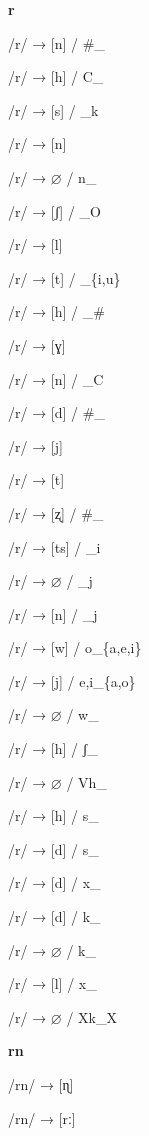 \begin{center}\textbf{r}\end{center}
\begin{multicols}{4}
\noindent /r/ → [n] / \#\_

\noindent /r/ → [h] / C\_

\noindent /r/ → [s] / \_k

\noindent /r/ → [n]

\noindent /r/ → $\varnothing$ / n\_

\noindent /r/ → [ʃ] / \_O

\noindent /r/ → [l]

\noindent /r/ → [t] / \_\{i,u\}

\noindent /r/ → [h] / \_\#

\noindent /r/ → [ɣ]

\noindent /r/ → [n] / \_C

\noindent /r/ → [d] / \#\_

\noindent /r/ → [j]

\noindent /r/ → [t]

\noindent /r/ → [ʐ] / \#\_

\noindent /r/ → [ts] / \_i

\noindent /r/ → $\varnothing$ / \_j

\noindent /r/ → [n] / \_j

\noindent /r/ → [w] / o\_\{a,e,i\}

\noindent /r/ → [j] / {e,i}\_\{a,o\}

\noindent /r/ → $\varnothing$ / w\_

\noindent /r/ → [h] / ʃ\_

\noindent /r/ → $\varnothing$ / Vh\_

\noindent /r/ → [h] / s\_

\noindent /r/ → [d] / s\_

\noindent /r/ → [d] / x\_

\noindent /r/ → [d] / k\_

\noindent /r/ → $\varnothing$ / k\_

\noindent /r/ → [l] / x\_

\noindent /r/ → $\varnothing$ / Xk\_X
\end{multicols}


\begin{center}\textbf{rn}\end{center}
\begin{multicols}{4}
\noindent /rn/ → [ɳ]

\noindent /rn/ → [rː]
\end{multicols}


